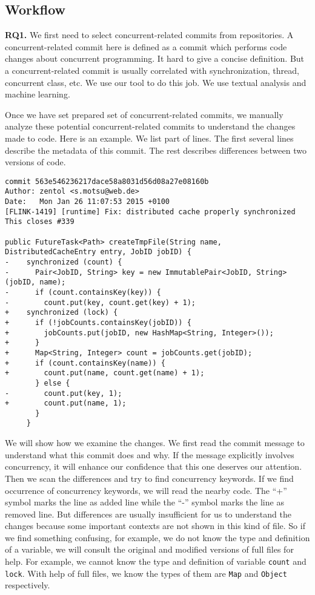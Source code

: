 \subsection{Workflow}
\label{sec:method:steps}
\textbf{RQ1.} We first need to select concurrent-related commits from repositories. A concurrent-related commit here is defined as a commit which performs code changes about concurrent programming. It hard to give a concise definition. But a concurrent-related commit is usually correlated with synchronization, thread, concurrent class, etc. We use our tool to do this job. We use textual analysis and machine learning.

Once we have set prepared set of concurrent-related commits, we manually analyze these potential concurrent-related commits to understand the changes made to code. Here is an example. We list part of lines. The first several lines describe the metadata of this commit. The rest describes differences between two versions of code.

\begin{lstlisting}
commit 563e546236217dace58a8031d56d08a27e08160b
Author: zentol <s.motsu@web.de>
Date:   Mon Jan 26 11:07:53 2015 +0100
[FLINK-1419] [runtime] Fix: distributed cache properly synchronized
This closes #339

public FutureTask<Path> createTmpFile(String name, DistributedCacheEntry entry, JobID jobID) {
-    synchronized (count) {
-      Pair<JobID, String> key = new ImmutablePair<JobID, String>(jobID, name);
-      if (count.containsKey(key)) {
-        count.put(key, count.get(key) + 1);
+    synchronized (lock) {
+      if (!jobCounts.containsKey(jobID)) {
+        jobCounts.put(jobID, new HashMap<String, Integer>());
+      }
+      Map<String, Integer> count = jobCounts.get(jobID);
+      if (count.containsKey(name)) {
+        count.put(name, count.get(name) + 1);
       } else {
-        count.put(key, 1);
+        count.put(name, 1);
       }
     }
\end{lstlisting}

We will show how we examine the changes. We first read the commit message to understand what this commit does and why. If the message explicitly involves concurrency, it will enhance our confidence that this one deserves our attention. Then we scan the differences and try to find concurrency keywords. If we find occurrence of concurrency keywords, we will read the nearby code. The ``+'' symbol marks the line as added line while the ``-'' symbol marks the line as removed line. But differences are usually insufficient for us to understand the changes because some important contexts are not shown in this kind of file. So if we find something confusing, for example, we do not know the type and definition of a variable, we will consult the original and modified versions of full files for help. For example, we cannot know the type and definition of variable \texttt{count} and \texttt{lock}. With help of full files, we know the types of them are \texttt{Map} and \texttt{Object} respectively.

